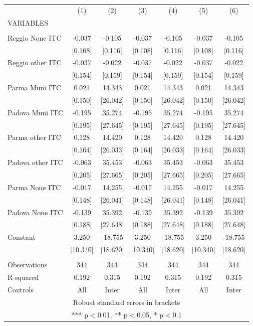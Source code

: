 \begin{tabular}{lcccccc} \hline
 & (1) & (2) & (3) & (4) & (5) & (6) \\
VARIABLES &  &  &  &  &  &  \\ \hline
 &  &  &  &  &  &  \\
Reggio None ITC & -0.037 & -0.105 & -0.037 & -0.105 & -0.037 & -0.105 \\
 & [0.108] & [0.116] & [0.108] & [0.116] & [0.108] & [0.116] \\
Reggio other ITC & -0.037 & -0.022 & -0.037 & -0.022 & -0.037 & -0.022 \\
 & [0.154] & [0.159] & [0.154] & [0.159] & [0.154] & [0.159] \\
Parma Muni ITC & 0.021 & 14.343 & 0.021 & 14.343 & 0.021 & 14.343 \\
 & [0.150] & [26.042] & [0.150] & [26.042] & [0.150] & [26.042] \\
Padova Muni ITC & -0.195 & 35.274 & -0.195 & 35.274 & -0.195 & 35.274 \\
 & [0.195] & [27.645] & [0.195] & [27.645] & [0.195] & [27.645] \\
Parma other ITC & 0.128 & 14.420 & 0.128 & 14.420 & 0.128 & 14.420 \\
 & [0.164] & [26.033] & [0.164] & [26.033] & [0.164] & [26.033] \\
Padova other ITC & -0.063 & 35.453 & -0.063 & 35.453 & -0.063 & 35.453 \\
 & [0.205] & [27.665] & [0.205] & [27.665] & [0.205] & [27.665] \\
Parma None ITC & -0.017 & 14.255 & -0.017 & 14.255 & -0.017 & 14.255 \\
 & [0.148] & [26.041] & [0.148] & [26.041] & [0.148] & [26.041] \\
Padova None ITC & -0.139 & 35.392 & -0.139 & 35.392 & -0.139 & 35.392 \\
 & [0.188] & [27.648] & [0.188] & [27.648] & [0.188] & [27.648] \\
Constant & 3.250 & -18.755 & 3.250 & -18.755 & 3.250 & -18.755 \\
 & [10.340] & [18.620] & [10.340] & [18.620] & [10.340] & [18.620] \\
 &  &  &  &  &  &  \\
Observations & 344 & 344 & 344 & 344 & 344 & 344 \\
R-squared & 0.192 & 0.315 & 0.192 & 0.315 & 0.192 & 0.315 \\
 Controls & All & Inter & All & Inter & All & Inter \\ \hline
\multicolumn{7}{c}{ Robust standard errors in brackets} \\
\multicolumn{7}{c}{ *** p$<$0.01, ** p$<$0.05, * p$<$0.1} \\
\end{tabular}
